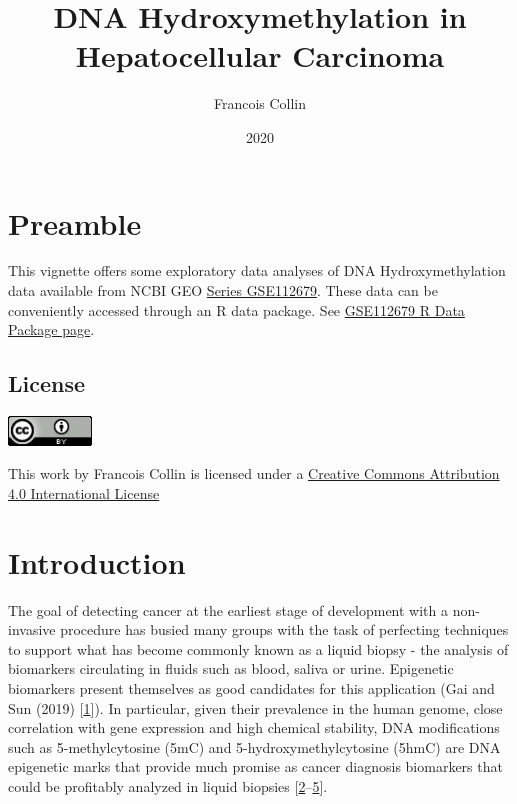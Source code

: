 \documentclass[
]{book}
\title{DNA Hydroxymethylation in Hepatocellular Carcinoma}
\author{Francois Collin}
\date{2020}
\begin{document}
\maketitle

{
\setcounter{tocdepth}{1}
\tableofcontents
}
\hypertarget{index}{%
\chapter*{Preamble}\label{index}}

This vignette offers some exploratory data analyses of
DNA Hydroxymethylation data available from
NCBI GEO \href{https://www.ncbi.nlm.nih.gov/geo/query/acc.cgi?acc=GSE112679}{Series GSE112679}.
These data can be conveniently accessed through an R data package.
See \href{https://12379monty.github.io/GSE112679/}{GSE112679 R Data Package page}.

\hypertarget{license}{%
\section*{License}\label{license}}

\includegraphics[width=0.88in]{Static/images/CC_4_0}

This work by Francois Collin is licensed under a
\href{http://creativecommons.org/licenses/by/4.0/}{Creative Commons Attribution 4.0 International License}

\hypertarget{intro}{%
\chapter{Introduction}\label{intro}}

The goal of detecting
cancer at the earliest stage of development with a non-invasive procedure
has busied many groups with the task of perfecting techniques to support
what has become commonly known as a
liquid biopsy - the analysis of biomarkers circulating in fluids such as blood,
saliva or urine. Epigenetic biomarkers present themselves as good candidates for this application
(Gai and Sun (2019) {[}\protect\hyperlink{ref-Gai:2019aa}{1}{]}). In particular,
given their prevalence in the human genome,
close correlation with gene expression and high chemical stability,
DNA modifications such as 5-methylcytosine (5mC) and 5-hydroxymethylcytosine (5hmC)
are DNA epigenetic marks that provide much promise as
cancer diagnosis biomarkers that could be profitably analyzed in liquid biopsies
{[}\protect\hyperlink{ref-Cai:2019aa}{2}--\protect\hyperlink{ref-Collin:2018aa}{5}{]}.
\end{document}
